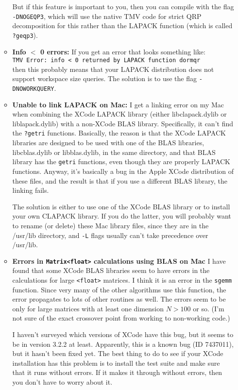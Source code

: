 \documentclass[twoside,letterpaper,11pt]{article}
\renewcommand{\tt}[1]{{\lstinline {#1}}}
\begin{document}
\begin{itemize}
\begin{itemize}
But if this feature is important to you, then you can compile with the flag \texttt{-DNOGEQP3},
which will use the native TMV code for strict QRP decomposition for this 
rather than the LAPACK function (which is called \tt{?geqp3}).

\item{\bf Info $<$ 0 errors:}
If you get an error that looks something like:\\
\texttt{TMV Error: info < 0 returned by LAPACK function dormqr}\\
then this probably means that your LAPACK distribution does not support
workspace size queries.  The solution is to use the flag \texttt{-DNOWORKQUERY}.

\item {\bf Unable to link LAPACK on Mac:}
I get a linking error on my Mac when combining the XCode LAPACK library
(either libclapack.dylib or liblapack.dylib) with a non-XCode BLAS library.
Specifically, it can't find the \texttt{?getri} functions.   Basically, the reason is that
the XCode LAPACK libraries are designed to be used with one of the BLAS
libraries, libcblas.dylib or libblas.dylib, in the same directory, 
and that BLAS library has the \texttt{getri}
functions, even though they are properly LAPACK functions.
Anyway, it's basically a bug in the Apple XCode distribution of these files,
and the result is that if you use a different BLAS library, the linking fails.

The solution is either to use one of the XCode BLAS library or to install your own CLAPACK
library.  If you do the latter, you will probably want to rename (or delete) these Mac
library files, since they are in the /usr/lib directory, and \tt{-L} flags usually can't take 
precedence over /usr/lib.

\item {\bf Errors in \tt{Matrix<float>} calculations using BLAS on Mac}
I have found that some XCode BLAS libraries seem to have errors in the 
calculations for large \tt{<float>} matrices.  I think it is an error in the \tt{sgemm}
function.  Since very many of the other algorithms use this function, the error
propagates to lots of other routines as well.  The errors seem to be only for
large matrices with at least one dimension $N > 100$ or so.  (I'm not sure of the 
exact crossover point from working to non-working code.)

I haven't surveyed which versions of XCode have this bug, but it seems to be in version
3.2.2 at least.  Apparently, this is a known bug (ID 7437011), but it hasn't been fixed yet.  
The best thing to do to see if your XCode installation has this problem
is to install the test suite and make sure that it runs without errors.  If it makes it 
through without errors, then you don't have to worry about it.


\end{itemize}
\end{itemize}
\end{document}
